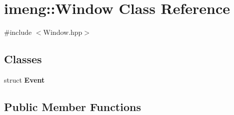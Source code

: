 \section{imeng\+::Window Class Reference}
\label{classimeng_1_1_window}


{\ttfamily \#include $<$Window.\+hpp$>$}

\subsection*{Classes}
\begin{DoxyCompactItemize}
\item 
struct \textbf{ Event}
\end{DoxyCompactItemize}
\subsection*{Public Member Functions}
